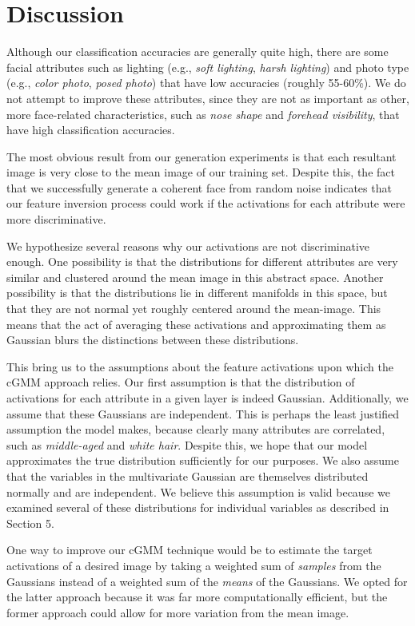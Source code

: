 \documentclass[10pt,twocolumn,letterpaper]{article}
\begin{document}
\section{Discussion}
Although our classification accuracies are generally quite high, there are some facial attributes such as lighting (e.g., \textit{soft lighting}, \textit{harsh lighting}) and photo type (e.g., \textit{color photo}, \textit{posed photo}) that have low accuracies (roughly 55-60\%). We do not attempt to improve these attributes, since they are not as important as other, more face-related characteristics, such as \textit{nose shape} and \textit{forehead visibility}, that have high classification accuracies.

The most obvious result from our generation experiments is that each resultant image is very close to the mean image of our training set.
Despite this, the fact that we successfully generate a coherent face from random noise indicates that our feature inversion process could work if the activations for each attribute were more discriminative.

We hypothesize several reasons why our activations are not discriminative enough. One possibility is that the distributions for different attributes are very similar and clustered around the mean image in this abstract space.
Another possibility is that the distributions lie in different manifolds in this space, but that they are not normal yet roughly centered around the mean-image.
This means that the act of averaging these activations and approximating them as Gaussian blurs the distinctions between these distributions.

This bring us to the assumptions about the feature activations upon which the cGMM approach relies.
Our first assumption is that the distribution of activations for each attribute in a given layer is indeed Gaussian.
Additionally, we assume that these Gaussians are independent. 
This is perhaps the least justified assumption the model makes, because clearly many attributes are correlated, such as \textit{middle-aged} and \textit{white hair}.
Despite this, we hope that our model approximates the true distribution sufficiently for our purposes.
We also assume that the variables in the multivariate Gaussian are themselves distributed normally and are independent.
We believe this assumption is valid because we examined several of these distributions for individual variables as described in Section 5.

One way to improve our cGMM technique would be to estimate the target activations of a desired image by taking a weighted sum of \emph{samples} from the Gaussians instead of a weighted sum of the \emph{means} of the Gaussians.
We opted for the latter approach because it was far more computationally efficient, but the former approach could allow for more variation from the mean image.
\end{document}
